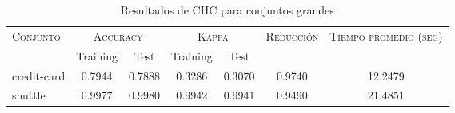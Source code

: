 \begin{table}[]
\centering
\begin{tabular}{l c c c c c c}
\hline
\multirow{2}{*}{\textsc{Conjunto}}
	& \multicolumn{2}{c}{\textsc{Accuracy}}
	& \multicolumn{2}{c}{\textsc{Kappa}}
	& \textsc{Reducción}
	& \textsc{Tiempo promedio (seg)} \\
	& Training & Test
	& Training & Test \\ 
\hline
\hline

credit-card & 0.7944 & 0.7888 & 0.3286 & 0.3070 & 0.9740 & 12.2479 \\
shuttle & 0.9977 & 0.9980 & 0.9942 & 0.9941 & 0.9490 & 21.4851 \\

\hline
\end{tabular}
\caption{Resultados de CHC para conjuntos grandes }
\label{res-grande-chc}
\end{table}

